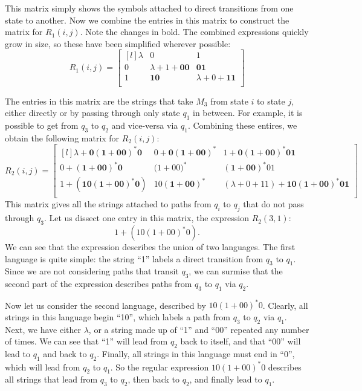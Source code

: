 \documentclass{bcthesis}
\begin{document}
\begin{example}
		This matrix simply shows the symbols attached to direct transitions from one state to another.
		Now we combine the entries in this matrix to construct the matrix for $R_1(i, j)$.
		Note the changes in bold. 
		The combined expressions quickly grow in size, so these have been simplified wherever possible:
		\[
			R_1 (i, j) = 
			\begin{bmatrix*}[l]
				\lambda 	& 0							& 1 						\\
				0 			& \lambda+1+\bm{00} 	& \bm{01}				\\
				1 			& \bm{10} 				& \lambda+0+\bm{11} 	\\
			\end{bmatrix*}
		\]

		The entries in this matrix are the strings that take $M_3$ from state $i$ to state $j$, either directly or by passing through only state $q_1$ in between.
		For example, it is possible to get from $q_3$ to $q_2$ and vice-versa via $q_1$.
		Combining these entires, we obtain the following matrix for $R_2(i, j)$:
		\[
			R_2 (i, j) = 
			\begin{bmatrix*}[l]
				\lambda + \bm{0(1+00)^*0} 	& 0+\bm{0(1+00)^*}		& 1+\bm{0(1+00)^*01}		\\
				0+\bm{(1+00)^*0} 			& \bm{(}1+00\bm{)^{*}} 	& \bm{(1+00)^*}01			\\
				1+\bm{(10(1+00)^*0)} 		& 10\bm{(1+00)^*} 		& (\lambda+0+11)+\bm{10(1+00)^*01} 	\\
			\end{bmatrix*}
		\]
		This matrix gives all the strings attached to paths from $q_i$ to $q_j$ that do not pass through $q_3$.
		Let us dissect one entry in this matrix, the expression $R_2(3, 1)$:
		\[
			1+(10(1+00)^*0).
		\]
		We can see that the expression describes the union of two languages.
		The first language is quite simple: the string ``1'' labels a direct transition from $q_3$ to $q_1$.
		Since we are not considering paths that transit $q_3$, we can surmise that the second part of the expression describes paths from $q_3$ to $q_1$ via $q_2$.

		Now let us consider the second language, described by $10 (1+00)^* 0$.
		Clearly, all strings in this language begin ``10'', which labels a path from $q_3$ to $q_2$ via $q_1$.
		Next, we have either $\lambda$, or a string made up of ``1'' and ``00'' repeated any number of times.
		We can see that ``1'' will lead from $q_2$ back to itself, and that ``00'' will lead to $q_1$ and back to $q_2$.
		Finally, all strings in this language must end in ``0'', which will lead from $q_2$ to $q_1$.
		So the regular expression $10 (1+00)^* 0$ describes all strings that lead from $q_3$ to $q_2$, then back to $q_2$, and finally lead to $q_1$.


\end{example}
\end{document}
